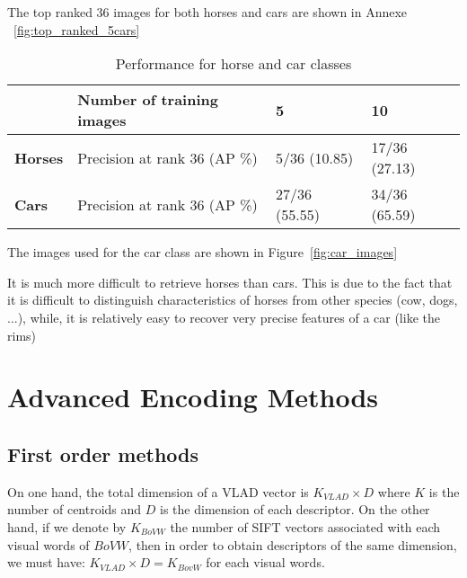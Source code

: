 \documentclass{article}
\begin{document}


The top ranked 36 images for both horses and cars are shown in Annexe ~\ref{fig:top_ranked_5cars}

\begin{table}[H]
\centering
\begin{tabular}{@{}llll@{}}
\toprule
\textbf{} & \textbf{Number of training images} & \textbf{5} & \textbf{10} \\ \midrule
\textbf{Horses} & Precision at rank 36 (AP \%) & 5/36 (10.85) & 17/36 (27.13) \\
\textbf{Cars} & Precision at rank 36 (AP \%) & 27/36 (55.55) & 34/36 (65.59) \\ \bottomrule
\end{tabular}
\caption{Performance for horse and car classes}
\label{table:P_comparison}
\end{table}

The images used for the car class are shown in Figure~\ref{fig:car_images}


It is much more difficult to retrieve horses than cars. This is due to the fact that it is difficult to distinguish characteristics of horses from other species (cow, dogs, ...), while,
it is relatively easy to recover very precise features of a car (like the rims)

\section{Advanced Encoding Methods}
\subsection{First order methods}

On one hand, the total dimension of a VLAD vector is $K_{VLAD}\times D$ where $K$ is the number of centroids and $D$ is the dimension of each descriptor. On the other hand, if we denote by $K_{BoVW}$ the number of SIFT vectors associated with each visual words of $BoVW$, then in order to obtain descriptors of the same dimension, we must have: $K_{VLAD}\times D = K_{BovW}$ for each visual words.
\end{document}
